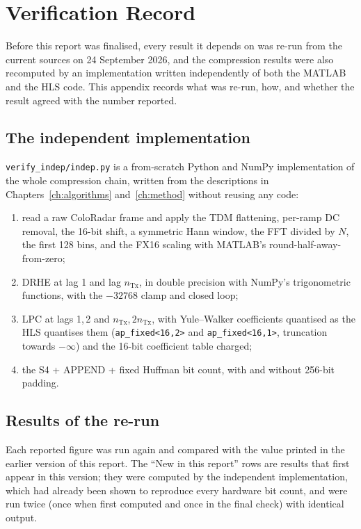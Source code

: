 \chapter{Verification Record}
\label{app:verify}

Before this report was finalised, every result it depends on was re-run from
the current sources on 24 September 2026, and the compression results were
also recomputed by an implementation written independently of both the MATLAB
and the HLS code. This appendix records what was re-run, how, and whether the
result agreed with the number reported.

\section{The independent implementation}

\texttt{verify\_indep/indep.py} is a from-scratch Python and NumPy
implementation of the whole compression chain, written from the descriptions in
Chapters~\ref{ch:algorithms} and~\ref{ch:method} without reusing any code:

\begin{enumerate}
\item read a raw ColoRadar frame and apply the TDM flattening, per-ramp DC
removal, the 16-bit shift, a symmetric Hann window, the FFT divided by $N$, the
first 128 bins, and the FX16 scaling with MATLAB's round-half-away-from-zero;
\item DRHE at lag 1 and lag $n_{\mathrm{Tx}}$, in double precision with NumPy's
trigonometric functions, with the $-32768$ clamp and closed loop;
\item LPC at lags 1,\,2 and $n_{\mathrm{Tx}}$,\,$2n_{\mathrm{Tx}}$, with
Yule--Walker coefficients quantised as the HLS quantises them
(\texttt{ap\_fixed<16,2>} and \texttt{ap\_fixed<16,1>}, truncation towards
$-\infty$) and the 16-bit coefficient table charged;
\item the S4 + APPEND + fixed Huffman bit count, with and without 256-bit
padding.
\end{enumerate}

\section{Results of the re-run}

Each reported figure was run again and compared with the value printed in the
earlier version of this report. The ``New in this report'' rows are results that
first appear in this version; they were computed by the independent
implementation, which had already been shown to reproduce every hardware bit
count, and were run twice (once when first computed and once in the final
check) with identical output.

